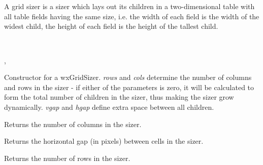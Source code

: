 \section{}\label{wxgridsizer}

A grid sizer is a sizer which lays out its children in a two-dimensional
table with all table fields having the same size,
i.e. the width of each field is the width of the widest child,
the height of each field is the height of the tallest child.


\\


, 

\label{wxgridsizerwxgridsizer}



Constructor for a wxGridSizer. {\it rows} and {\it cols} determine the number of
columns and rows in the sizer - if either of the parameters is zero, it will be
calculated to form the total number of children in the sizer, thus making the
sizer grow dynamically. {\it vgap} and {\it hgap} define extra space between
all children.

\label{wxgridsizergetcols}


Returns the number of columns in the sizer.


\label{wxgridsizergethgap}


Returns the horizontal gap (in pixels) between cells in the sizer.


\label{wxgridsizergetrows}


Returns the number of rows in the sizer.


\label{wxgridsizergetvgap}


